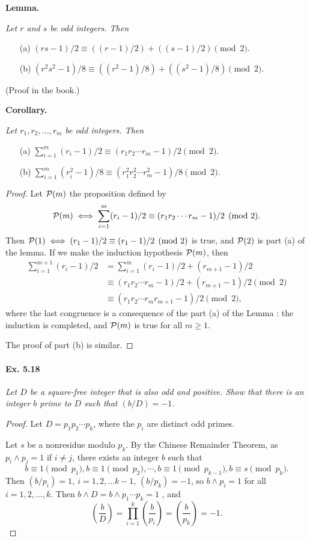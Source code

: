 \documentclass[11pt,a4paper]{article}
\newcommand{\legendre}[2]{\genfrac{(}{)}{}{}{#1}{#2}}
\begin{document}
{\bf Lemma.} {\it Let $r$ and $s$ be odd integers. Then
\begin{enumerate}
\item[(a)] $(rs-1)/2 \equiv ((r-1)/2) + ((s-1)/2) \pmod 2$.
\item[(b)] $(r^2s^2 - 1)/8 \equiv ((r^2-1)/8) + ((s^2-1)/8)\pmod 2$.
\end{enumerate}
\it}

(Proof in the book.)

\bigskip

{\bf Corollary.} {\it Let $r_1,r_2,\ldots,r_m$ be odd integers. Then
\begin{enumerate}
\item[(a)] $\sum_{i=1}^m (r_i-1)/2 \equiv (r_1r_2\cdots r_m-1)/2 \pmod 2$.
\item[(b)] $\sum_{i=1}^m (r_i^2-1)/8 \equiv (r_1^2r_2^2\cdots r_m^2 -1)/8 \pmod 2$.
\end{enumerate}
\it}
\begin{proof} Let ${\cal P}(m)$ the proposition defined by
$${\cal P}(m) \iff \sum_{i=1}^m (r_i-1)/2 \equiv (r_1r_2\cdots r_m-1)/2 \pmod 2.$$
Then ${\cal P}(1)\iff (r_1-1)/2 \equiv (r_1-1)/2 \pmod 2$ is true, and ${\cal P}(2)$ is part (a) of the lemma. If we make the induction hypothesis ${\cal P}(m)$, then
\begin{align*}
\sum_{i=1}^{m+1} (r_i-1)/2 &= \sum_{i=1}^m (r_i-1)/2 + (r_{m+1} -1)/2\\
&\equiv (r_1r_2\cdots r_m-1)/2 + (r_{m+1} -1)/2 \pmod 2\\
&\equiv (r_1r_2\cdots r_m r_{m+1}-1)/2 \pmod 2,
\end{align*}
where the last congruence is a consequence of the part (a) of the Lemma : the induction is completed, and ${\cal P}(m)$ is true for all $m\geq 1$.

The proof of part (b) is similar.
\end{proof}

\paragraph{Ex. 5.18}

{\it Let $D$ be a square-free integer that is also odd and positive. Show that there is an integer $b$ prime to $D$ such that $(b/D) = -1$.
}

\begin{proof}
Let $D = p_1p_2\cdots p_k$, where the $p_i$ are distinct odd primes.

Let $s$ be a nonresidue modulo $p_k$. By the Chinese Remainder Theorem, as $p_i \wedge p_j = 1$ if $i\ne j$,  there exists an integer $b$ such that
$$b \equiv 1 \pmod {p_1}, b \equiv 1 \pmod {p_2},\cdots, b \equiv 1 \pmod {p_{k-1}}, b \equiv s \pmod {p_k}.$$
Then $(b/p_i) = 1,\ i=1,2,\ldots k-1$, $(b/p_{k}) = -1$, so $b\wedge p_i = 1$ for all $i = 1,2,\ldots,k$. Then $b\wedge D = b\wedge p_1\cdots p_k = 1$ , and 
$$\legendre{b}{D} = \prod_{i=1}^k \legendre {b}{p_i} = \legendre{b}{p_k} = -1.$$
\end{proof}
\end{document}
